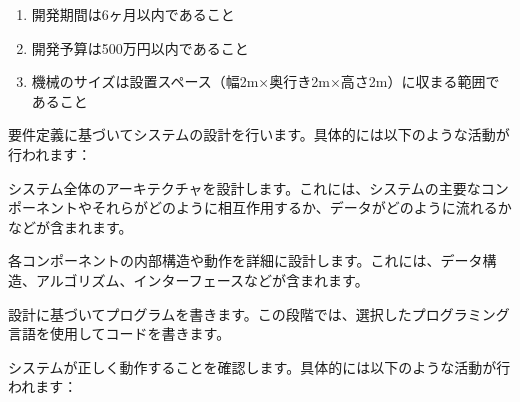 \begin{enumerate}
\item 開発期間は6ヶ月以内であること
\item 開発予算は500万円以内であること
\item 機械のサイズは設置スペース（幅2m×奥行き2m×高さ2m）に収まる範囲であること
\end{enumerate}




要件定義に基づいてシステムの設計を行います。具体的には以下のような活動が行われます：




システム全体のアーキテクチャを設計します。これには、システムの主要なコンポーネントやそれらがどのように相互作用するか、データがどのように流れるかなどが含まれます。




各コンポーネントの内部構造や動作を詳細に設計します。これには、データ構造、アルゴリズム、インターフェースなどが含まれます。



設計に基づいてプログラムを書きます。この段階では、選択したプログラミング言語を使用してコードを書きます。



システムが正しく動作することを確認します。具体的には以下のような活動が行われます：




